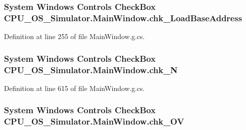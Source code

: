 \subsubsection[{chk\+\_\+\+Load\+Base\+Address}]{\setlength{\rightskip}{0pt plus 5cm}System Windows Controls Check\+Box C\+P\+U\+\_\+\+O\+S\+\_\+\+Simulator.\+Main\+Window.\+chk\+\_\+\+Load\+Base\+Address\hspace{0.3cm}{\ttfamily [package]}}\label{class_c_p_u___o_s___simulator_1_1_main_window_a8ade8cf3e5e2ec2374c984dac406b5e9}


Definition at line 255 of file Main\+Window.\+g.\+cs.

\hypertarget{class_c_p_u___o_s___simulator_1_1_main_window_ab8a23e33c5c71e359574de36ccf8d991}{}
\subsubsection[{chk\+\_\+\+N}]{\setlength{\rightskip}{0pt plus 5cm}System Windows Controls Check\+Box C\+P\+U\+\_\+\+O\+S\+\_\+\+Simulator.\+Main\+Window.\+chk\+\_\+\+N\hspace{0.3cm}{\ttfamily [package]}}\label{class_c_p_u___o_s___simulator_1_1_main_window_ab8a23e33c5c71e359574de36ccf8d991}


Definition at line 615 of file Main\+Window.\+g.\+cs.

\hypertarget{class_c_p_u___o_s___simulator_1_1_main_window_adfbc519740506214093673b8015ea67d}{}
\subsubsection[{chk\+\_\+\+O\+V}]{\setlength{\rightskip}{0pt plus 5cm}System Windows Controls Check\+Box C\+P\+U\+\_\+\+O\+S\+\_\+\+Simulator.\+Main\+Window.\+chk\+\_\+\+O\+V\hspace{0.3cm}{\ttfamily [package]}}\label{class_c_p_u___o_s___simulator_1_1_main_window_adfbc519740506214093673b8015ea67d}


